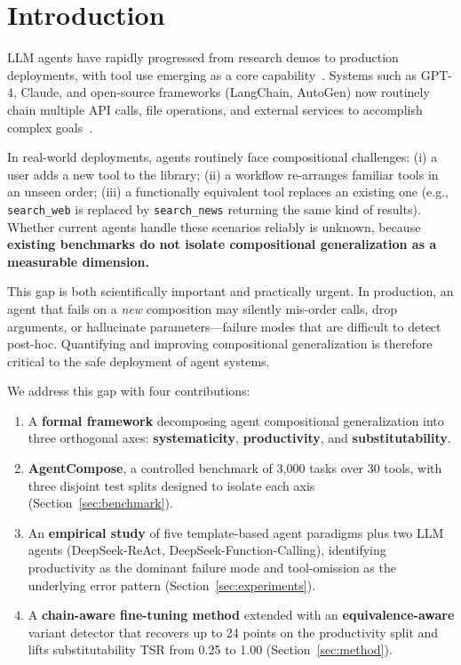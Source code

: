 \documentclass[10pt]{article}
\begin{document}
\section{Introduction}
\label{sec:intro}

LLM agents have rapidly progressed from research demos to production deployments, with tool use emerging as a core capability~\citep{schick2023toolformer, yao2023react, qin2023toolllm}. Systems such as GPT-4, Claude, and open-source frameworks (LangChain, AutoGen) now routinely chain multiple API calls, file operations, and external services to accomplish complex goals~\citep{liu2024agentbench, trivedi2024appworld, patil2024bfcl}.

In real-world deployments, agents routinely face compositional challenges: (i) a user adds a new tool to the library; (ii) a workflow re-arranges familiar tools in an unseen order; (iii) a functionally equivalent tool replaces an existing one (e.g., \texttt{search\_web} is replaced by \texttt{search\_news} returning the same kind of results). Whether current agents handle these scenarios reliably is unknown, because \textbf{existing benchmarks do not isolate compositional generalization as a measurable dimension.}

This gap is both scientifically important and practically urgent. In production, an agent that fails on a \emph{new} composition may silently mis-order calls, drop arguments, or hallucinate parameters---failure modes that are difficult to detect post-hoc. Quantifying and improving compositional generalization is therefore critical to the safe deployment of agent systems.

We address this gap with four contributions:

\begin{enumerate}
    \item A {\bf formal framework} decomposing agent compositional generalization into three orthogonal axes: {\bf systematicity}, {\bf productivity}, and {\bf substitutability}.
    \item {\bf AgentCompose}, a controlled benchmark of 3{,}000 tasks over 30 tools, with three disjoint test splits designed to isolate each axis (Section~\ref{sec:benchmark}).
    \item An {\bf empirical study} of five template-based agent paradigms plus two LLM agents (DeepSeek-ReAct, DeepSeek-Function-Calling), identifying productivity as the dominant failure mode and tool-omission as the underlying error pattern (Section~\ref{sec:experiments}).
    \item A {\bf chain-aware fine-tuning method} extended with an {\bf equivalence-aware} variant detector that recovers up to 24 points on the productivity split and lifts substitutability TSR from 0.25 to 1.00 (Section~\ref{sec:method}).
\end{enumerate}
\end{document}
